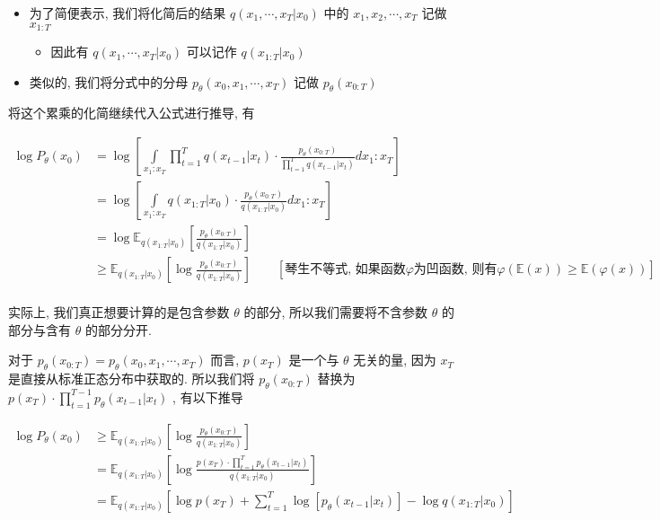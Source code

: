 \begin{itemize}
    \item 为了简便表示, 我们将化简后的结果 $q(x_1,\cdots,x_T|x_0)$ 中的 $x_1,x_2,\cdots, x_T$ 记做 $x_{1:T}$
    \begin{itemize}
        \item 因此有 $q(x_1,\cdots,x_T|x_0)$ 可以记作 $q(x_{1:T}|x_0)$
    \end{itemize}
    \item 类似的, 我们将分式中的分母 $p_\theta(x_0,x_1,\cdots,x_T)$ 记做 $p_\theta(x_{0:T})$
\end{itemize}

将这个累乘的化简继续代入公式进行推导, 有

\begin{equation}\begin{aligned}
	\log P_\theta(x_0)&=\log\left[\int\limits_{x_1:x_T} \prod_{t=1}^T q(x_{t-1}|x_t)\cdot\frac{p_\theta(x_{0:T}) }{\prod_{t=1}^T q(x_{t-1}|x_t)}dx_1:x_T\right]\\
	&=\log\left[\int\limits_{x_1:x_T} q(x_{1:T}|x_0)\cdot\frac{p_\theta(x_{0:T})}{q(x_{1:T}|x_0)}dx_1:x_T\right]\\
	&=\log \mathbb{E}_{q(x_{1:T}|x_0)}\left[\frac{p_\theta(x_{0:T})}{q(x_{1:T}|x_0)}\right]\\
	&\ge \mathbb{E}_{q(x_{1:T}|x_0)}\left[\log\frac{p_\theta(x_{0:T})}{q(x_{1:T}|x_0)}\right]\quad\quad[\text{琴生不等式, 如果函数}\varphi\text{为凹函数, 则有}\varphi\left(\mathbb{E}(x)\right)\ge\mathbb{E}\left(\varphi(x)\right)]\\
\end{aligned}\end{equation}



实际上, 我们真正想要计算的是包含参数 $\theta$ 的部分, 所以我们需要将不含参数 $\theta$ 的部分与含有 $\theta$ 的部分分开.

对于 $p_\theta(x_{0:T})=p_\theta(x_0,x_1,\cdots,x_T)$ 而言, $p(x_T)$ 是一个与 $\theta$ 无关的量, 因为 $x_T$ 是直接从标准正态分布中获取的. 所以我们将 $p_\theta(x_{0:T})$ 替换为 $p(x_T)\cdot\prod\limits_{t=1}^{T-1}p_\theta(x_{t-1}|x_t)$ , 有以下推导


\begin{equation}
\begin{aligned}
	\log P_\theta(x_0) &\ge \mathbb{E}_{q(x_{1:T}|x_0)}\left[\log\frac{p_\theta(x_{0:T})}{q(x_{1:T}|x_0)}\right]\\
	&=\mathbb{E}_{q(x_{1:T}|x_0)}\left[\log\frac{p(x_T)\cdot\prod\limits_{t=1}^{T}p_\theta(x_{t-1}|x_t)}{q(x_{1:T}|x_0)}\right]\\
	&=\mathbb{E}_{q(x_{1:T}|x_0)}\left[\log p(x_T)+\sum_{t=1}^{T}\log\left[p_\theta(x_{t-1}|x_t)\right]-\log q(x_{1:T}|x_0)\right]\\	
\end{aligned}
\end{equation}


